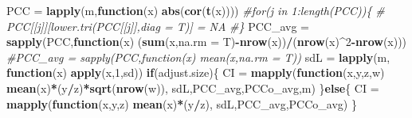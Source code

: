 \documentclass[]{article}
\newenvironment{Shaded}{\begin{snugshade}}{\end{snugshade}}
\newcommand{\CommentTok}[1]{\textcolor[rgb]{0.56,0.35,0.01}{\textit{#1}}}
\newcommand{\ControlFlowTok}[1]{\textcolor[rgb]{0.13,0.29,0.53}{\textbf{#1}}}
\newcommand{\DataTypeTok}[1]{\textcolor[rgb]{0.13,0.29,0.53}{#1}}
\newcommand{\DecValTok}[1]{\textcolor[rgb]{0.00,0.00,0.81}{#1}}
\newcommand{\KeywordTok}[1]{\textcolor[rgb]{0.13,0.29,0.53}{\textbf{#1}}}
\newcommand{\NormalTok}[1]{#1}
\newcommand{\OperatorTok}[1]{\textcolor[rgb]{0.81,0.36,0.00}{\textbf{#1}}}
\newcommand{\StringTok}[1]{\textcolor[rgb]{0.31,0.60,0.02}{#1}}
\begin{document}
\begin{Shaded}
\begin{Highlighting}[]
{{\NormalTok{      PCC =}\StringTok{ }\KeywordTok{lapply}\NormalTok{(m,}\ControlFlowTok{function}\NormalTok{(x) }\KeywordTok{abs}\NormalTok{(}\KeywordTok{cor}\NormalTok{(}\KeywordTok{t}\NormalTok{(x))))}
      \CommentTok{#for(j in 1:length(PCC))\{}
      \CommentTok{#  PCC[[j]][lower.tri(PCC[[j]],diag = T)] = NA}
      \CommentTok{#\}}
\NormalTok{      PCC_avg =}\StringTok{ }\KeywordTok{sapply}\NormalTok{(PCC,}\ControlFlowTok{function}\NormalTok{(x) (}\KeywordTok{sum}\NormalTok{(x,}\DataTypeTok{na.rm =}\NormalTok{ T)}\OperatorTok{-}\KeywordTok{nrow}\NormalTok{(x))}\OperatorTok{/}\NormalTok{(}\KeywordTok{nrow}\NormalTok{(x)}\OperatorTok{^}\DecValTok{2}\OperatorTok{-}\KeywordTok{nrow}\NormalTok{(x)))}
      \CommentTok{#PCC_avg = sapply(PCC,function(x) mean(x,na.rm = T))}
\NormalTok{      sdL =}\StringTok{ }\KeywordTok{lapply}\NormalTok{(m, }\ControlFlowTok{function}\NormalTok{(x) }\KeywordTok{apply}\NormalTok{(x,}\DecValTok{1}\NormalTok{,sd))}
      \ControlFlowTok{if}\NormalTok{(adjust.size)\{}
\NormalTok{        CI =}\StringTok{ }\KeywordTok{mapply}\NormalTok{(}\ControlFlowTok{function}\NormalTok{(x,y,z,w) }\KeywordTok{mean}\NormalTok{(x)}\OperatorTok{*}\NormalTok{(y}\OperatorTok{/}\NormalTok{z)}\OperatorTok{*}\KeywordTok{sqrt}\NormalTok{(}\KeywordTok{nrow}\NormalTok{(w)), sdL,PCC_avg,PCCo_avg,m)}
\NormalTok{      \}}\ControlFlowTok{else}\NormalTok{\{}
\NormalTok{        CI =}\StringTok{ }\KeywordTok{mapply}\NormalTok{(}\ControlFlowTok{function}\NormalTok{(x,y,z) }\KeywordTok{mean}\NormalTok{(x)}\OperatorTok{*}\NormalTok{(y}\OperatorTok{/}\NormalTok{z), sdL,PCC_avg,PCCo_avg)}
\NormalTok{      \}}

}}
\end{Highlighting}
\end{Shaded}
\end{document}
